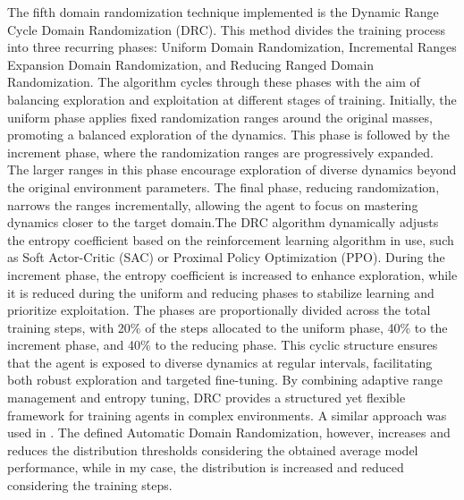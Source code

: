 \documentclass[11pt]{article}
\begin{document}
The fifth domain randomization technique implemented is the Dynamic Range Cycle Domain Randomization (DRC). This method divides the training process into three recurring phases: Uniform Domain Randomization, Incremental Ranges Expansion Domain Randomization, and Reducing Ranged Domain Randomization. The algorithm cycles through these phases with the aim of balancing exploration and exploitation at different stages of training. Initially, the uniform phase applies fixed randomization ranges around the original masses, promoting a balanced exploration of the dynamics. This phase is followed by the increment phase, where the randomization ranges are progressively expanded. The larger ranges in this phase encourage exploration of diverse dynamics beyond the original environment parameters. The final phase, reducing randomization, narrows the ranges incrementally, allowing the agent to focus on mastering dynamics closer to the target domain.The DRC algorithm dynamically adjusts the entropy coefficient based on the reinforcement learning algorithm in use, such as Soft Actor-Critic (SAC) or Proximal Policy Optimization (PPO). During the increment phase, the entropy coefficient is increased to enhance exploration, while it is reduced during the uniform and reducing phases to stabilize learning and prioritize exploitation. The phases are proportionally divided across the total training steps, with 20\% of the steps allocated to the uniform phase, 40\% to the increment phase, and 40\% to the reducing phase. This cyclic structure ensures that the agent is exposed to diverse dynamics at regular intervals, facilitating both robust exploration and targeted fine-tuning. By combining adaptive range management and entropy tuning, DRC provides a structured yet flexible framework for training agents in complex environments. A similar approach was used in \cite{Akkaya2020}. The defined Automatic Domain Randomization, however, increases and reduces the distribution thresholds considering the obtained average model performance, while in my case, the distribution is increased and reduced considering the training steps.\\
\end{document}
